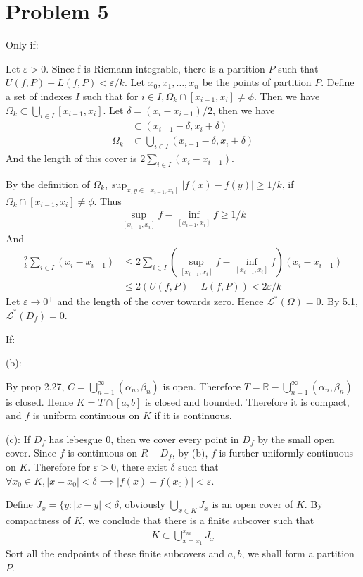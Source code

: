 \documentclass[a4paper]{report}
\def\ve{\varepsilon}
\newcommand{\mcal}[1]{\mathcal{#1}}
\begin{document}
\section*{Problem 5}
Only if: 

Let $\ve > 0$.  Since f is Riemann integrable, there is a partition $P$ such that 
$U(f, P) - L(f, P) < \ve/k$. Let $x_0, x_1, \ldots, x_n$ be the points of partition $P$.
Define a set of indexes $I$ such that for $i \in I, \Omega_k \cap [x_{i-1}, x_i] \neq\phi$.
Then we have $\Omega_k \subset \bigcup_{i \in I} [x_{i-1},x_i]$.
Let $\delta = (x_i - x_{i-1})/2$, then we have 
\begin{align*}
    [x_{i-1}, x_i] &\subset (x_{i-1}-\delta, x_i+\delta) \\
    \Omega_k &\subset \bigcup_{i \in I} (x_{i-1}-\delta, x_i + \delta)
\end{align*}
And the length of this cover is $2\sum_{i \in I} (x_i - x_{i-1})$.

By the definition of $\Omega_k, \sup_{x, y \in [x_{i-1}, x_i]} |f(x) - f(y)| \ge 1/k$, if 
$\Omega_k \cap [x_{i-1}, x_i] \neq\phi$. Thus
\begin{align*}
    \sup_{[x_{i-1}, x_i]} f - \inf_{[x_{i-1}, x_i]} f \ge 1/k
\end{align*}
And
\begin{align*}
    \frac{2}{k}\sum_{i \in I} (x_i - x_{i-1}) &\le 2\sum_{i \in I} 
    \left(\sup_{[x_{i-1}, x_i]} f - \inf_{[x_{i-1}, x_i]} f\right)(x_i-x_{i-1}) \\
    &\le 2(U(f, P) - L(f, P)) < 2\ve/k
\end{align*}
Let $\ve \to 0^+$ and the length of the cover towards zero. Hence $\mcal{L}^*(\Omega) = 0$.
By 5.1, $\mcal{L}^*(D_f) = 0$.

If:

(b):

By prop 2.27, $C = \bigcup_{n=1}^\infty (\alpha_n, \beta_n)$ is open. Therefore $T = \mathbb{R} -
\bigcup_{n=1}^\infty (\alpha_n, \beta_n)$ is closed. Hence $K = T \cap [a,b]$ is closed and 
bounded. Therefore it is compact, and $f$ is uniform continuous on $K$ if it is continuous.

(c):
If $D_f$ has lebesgue 0, then we cover every point in $D_f$ by the small open cover. 
Since $f$ is continuous on $R - D_f$, by (b), $f$ is further uniformly continuous on $K$.
Therefore for $\ve > 0$, there exist $\delta$ such that $\forall x_0 \in K, |x-x_0| < \delta 
\implies |f(x)-f(x_0)| < \ve$. 

Define $J_x = \{y: |x - y| <\delta$, obviously $\bigcup_{x \in K} J_x$ is an open cover 
of $K$. By compactness of $K$, we conclude that there is a finite subcover such that 
\begin{align*}
    K \subset \bigcup_{x=x_1}^{x_m} J_{x}
\end{align*}
Sort all the endpoints of these finite subcovers and $a, b$, we shall form a partition $P$. 
\end{document}

